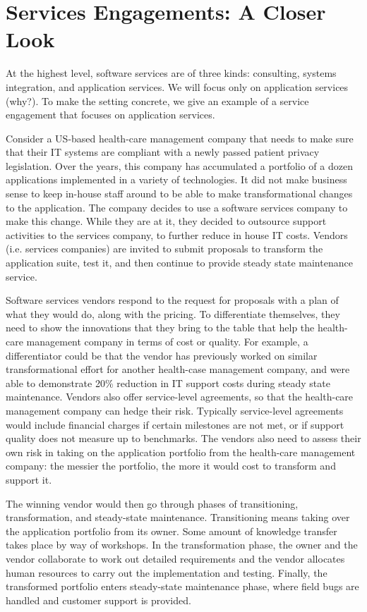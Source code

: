 \section{Services Engagements: A Closer Look}

At the highest level, software services are of three kinds: consulting, systems integration, and application services. We will focus only on application services (why?).  To make the setting concrete, we give an example of a service engagement that focuses on application services. 

Consider a US-based health-care management company that needs to make sure that their IT systems are compliant with a newly passed patient privacy legislation. Over the years, this company has accumulated a portfolio of a dozen applications implemented in a variety of technologies. It did not make business sense to keep in-house staff around to be able to make transformational changes to the application. The company decides to use a software services company to make this change. While they are at it, they decided to outsource support activities to the services company, to further reduce in house IT costs.  Vendors (i.e. services companies) are invited to submit proposals to transform the application suite, test it, and then continue to provide steady state maintenance service.

Software services vendors respond to the request for proposals with a plan of what they would do, along with the pricing. To differentiate themselves, they need to show the innovations that they bring to the table that help the health-care management company in terms of cost or quality. For example, a differentiator could be that the vendor has previously worked on similar transformational effort for another health-case management company, and were able to demonstrate 20\% reduction in IT support costs during steady state maintenance. Vendors also offer service-level agreements, so that the health-care management company can hedge their risk.  Typically service-level agreements would include financial charges if certain milestones are not met, or if support quality does not measure up to benchmarks. The vendors also need to assess their own risk in taking on the application portfolio from the health-care management company: the messier the portfolio, the more it would cost to transform and support it.

The winning vendor would then go through phases of transitioning, transformation, and steady-state maintenance. Transitioning means taking over the application portfolio from its owner. Some amount of knowledge transfer takes place by way of workshops. In the transformation phase, the owner and the vendor collaborate to work out detailed requirements and the vendor allocates human resources to carry out the implementation and testing. Finally, the transformed portfolio enters steady-state maintenance phase, where field bugs are handled and customer support is provided.

